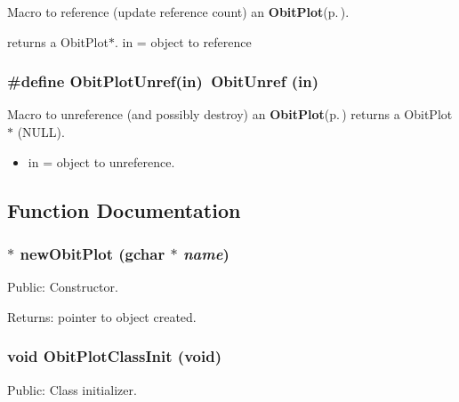 Macro to reference (update reference count) an {\bf Obit\-Plot}{\rm (p.\,\pageref{structObitPlot})}. 

returns a Obit\-Plot$\ast$. in = object to reference 
\subsubsection{\setlength{\rightskip}{0pt plus 5cm}\#define Obit\-Plot\-Unref(in)\ Obit\-Unref (in)}\label{ObitPlot_8h_a0}


Macro to unreference (and possibly destroy) an {\bf Obit\-Plot}{\rm (p.\,\pageref{structObitPlot})} returns a Obit\-Plot$\ast$ (NULL). 

\begin{itemize}
\item in = object to unreference. \end{itemize}


\subsection{Function Documentation}
\subsubsection{$\ast$ new\-Obit\-Plot (gchar $\ast$ {\em name})}\label{ObitPlot_8h_a4}


Public: Constructor. 

\begin{Desc}
\item[Returns:]pointer to object created. \end{Desc}
\subsubsection{\setlength{\rightskip}{0pt plus 5cm}void Obit\-Plot\-Class\-Init (void)}\label{ObitPlot_8h_a3}


Public: Class initializer. 

